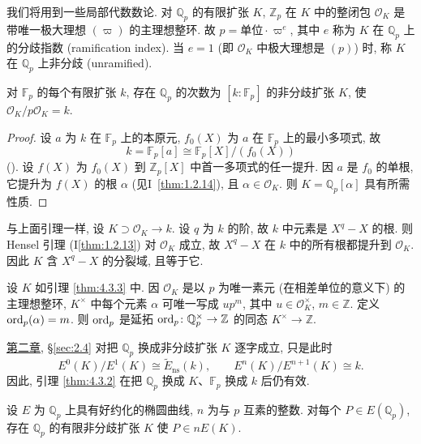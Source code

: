 我们将用到一些局部代数数论. 对 $\mathbb{Q}_p$ 的有限扩张 $K$, $\mathbb{Z}_p$ 在 $K$ 中的整闭包 $\mathcal{O}_K$ 是带唯一极大理想 $(\varpi)$ 的主理想整环. 故 $p = \text{单位}\cdot\varpi^e$, 其中 $e$ 称为 $K$ 在 $\mathbb{Q}_p$ 上的分歧指数 (ramification index). 当 $e = 1$ (即 $\mathcal{O}_K$ 中极大理想是 $(p)$) 时, 称 $K$ 在 $\mathbb{Q}_p$ 上非分歧 (unramified).

\begin{lemma} \label{thm:4.3.3} 
对 $\mathbb{F}_p$ 的每个有限扩张 $k$, 存在 $\mathbb{Q}_p$ 的次数为 $[k:\mathbb{F}_p]$ 的非分歧扩张 $K$, 使 $\mathcal{O}_K/p\mathcal{O}_K = k$.
\end{lemma}

\begin{proof}
设 $a$ 为 $k$ 在 $\mathbb{F}_p$ 上的本原元, $f_0(X)$ 为 $a$ 在 $\mathbb{F}_p$ 上的最小多项式, 故
\[
k = \mathbb{F}_p[a]\cong\mathbb{F}_p[X]/(f_0(X))
\]
(\cite[5.1]{milne-ft}). 设 $f(X)$ 为 $f_0(X)$ 到 $\mathbb{Z}_p[X]$ 中首一多项式的任一提升. 因 $a$ 是 $f_0$ 的单根, 它提升为 $f(X)$ 的根 $\alpha$ (见I~\ref{thm:1.2.14}), 且 $\alpha\in\mathcal{O}_K$. 则 $K = \mathbb{Q}_p[\alpha]$ 具有所需性质.
\end{proof}

\begin{remark} \label{thm:4.3.4} 
与上面引理一样, 设 $K\supset\mathcal{O}_K\to k$. 设 $q$ 为 $k$ 的阶, 故 $k$ 中元素是 $X^q - X$ 的根. 则 Hensel 引理 (I\ref{thm:1.2.13}) 对 $\mathcal{O}_K$ 成立, 故 $X^q - X$ 在 $k$ 中的所有根都提升到 $\mathcal{O}_K$. 因此 $K$ 含 $X^q - X$ 的分裂域, 且等于它.
\end{remark}

设 $K$ 如引理 \ref{thm:4.3.3} 中. 因 $\mathcal{O}_K$ 是以 $p$ 为唯一素元 (在相差单位的意义下) 的主理想整环, $K^{\times}$ 中每个元素 $\alpha$ 可唯一写成 $up^m$, 其中 $u\in\mathcal{O}_K^{\times}$, $m\in\mathbb{Z}$. 定义 $\operatorname*{ord}\nolimits_p(\alpha) = m$. 则 $\operatorname*{ord}\nolimits_p$ 是延拓 $\operatorname*{ord}\nolimits_p\colon\mathbb{Q}_p^{\times}\to\mathbb{Z}$ 的同态 $K^{\times}\to\mathbb{Z}$.

\hyperref[ch:2]{第二章}, \S\ref{sec:2.4} 对把 $\mathbb{Q}_p$ 换成非分歧扩张 $K$ 逐字成立, 只是此时
\[
E^0(K)/E^1(K)\cong\tilde{E}_{\mathrm{ns}}(k), \qquad
E^n(K)/E^{n+1}(K)\cong k.
\]
因此, 引理 \ref{thm:4.3.2} 在把 $\mathbb{Q}_p$ 换成 $K$、$\mathbb{F}_p$ 换成 $k$ 后仍有效.

\begin{lemma} \label{thm:4.3.5} 
设 $E$ 为 $\mathbb{Q}_p$ 上具有好约化的椭圆曲线, $n$ 为与 $p$ 互素的整数. 对每个 $P\in E(\mathbb{Q}_p)$, 存在 $\mathbb{Q}_p$ 的有限非分歧扩张 $K$ 使 $P\in nE(K)$.
\end{lemma}

